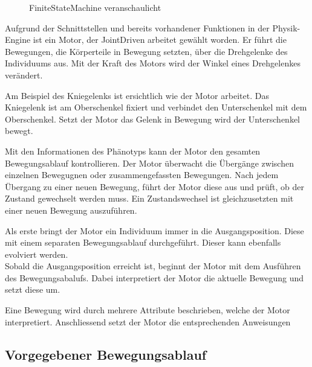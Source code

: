       \begin{figure}[H]
        \centering
        
        \caption{\Gls{FiniteStateMachine} veranschaulicht\label{fig:ConceptEngineFSM}}
      \end{figure}

      Aufgrund der Schnittstellen und bereits vorhandener Funktionen in der Physik-Engine ist ein Motor,
      der \gls{JointDriven} arbeitet gewählt worden.
      Er führt die Bewegungen, die Körperteile in Bewegung setzten, über die Drehgelenke des Individuums aus.
      Mit der Kraft des Motors wird der Winkel eines Drehgelenkes verändert.

      \smallskip

      Am Beispiel des Kniegelenks ist ersichtlich wie der Motor arbeitet.
      Das Kniegelenk ist am Oberschenkel fixiert und verbindet den Unterschenkel mit dem Oberschenkel.
      Setzt der Motor das Gelenk in Bewegung wird der Unterschenkel bewegt.

      \smallskip

      Mit den Informationen des Phänotyps kann der Motor den gesamten Bewegungsablauf kontrollieren.
      Der Motor überwacht die Übergänge zwischen einzelnen Bewegugnen oder zusammengefassten Bewegungen. %
      Nach jedem Übergang zu einer neuen Bewegung, führt der Motor diese aus und prüft,
      ob der Zustand gewechselt werden muss.
      Ein Zustandswechsel ist gleichzusetzten mit einer neuen Bewegung auszuführen.

      \smallskip

      Als erste bringt der Motor ein Individuum immer in die Ausgangsposition.
      Diese mit einem separaten Bewegungsablauf durchgeführt. Dieser kann ebenfalls evolviert werden.
      \\
      Sobald die Ausgangsposition erreicht ist, beginnt der Motor mit dem Ausführen des Bewegungsabalufs.
      Dabei interpretiert der Motor die aktuelle Bewegung und setzt diese um.


      Eine Bewegung wird durch mehrere Attribute beschrieben, welche der Motor interpretiert.
      Anschliessend setzt der Motor die entsprechenden Anweisungen

    \subsection{Vorgegebener Bewegungsablauf}

